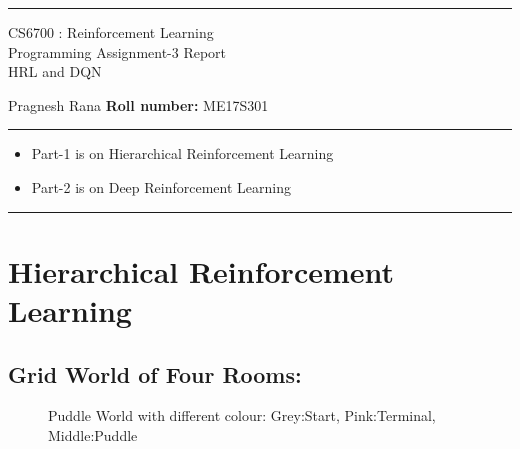\documentclass[preprint,12pt]{elsarticle}
\begin{document}
\hrule
\vspace{1mm}
\noindent 
\begin{center}
{\Large CS6700 : Reinforcement Learning} \\

{\large Programming Assignment-3 Report} \\
{\large HRL and DQN   \hfill }
\end{center}
\vspace{1mm}
\noindent 



 Pragnesh Rana \hfill {\bf Roll number:} ME17S301
\vspace{2mm}
\hrule

{\small

\begin{itemize}\itemsep0mm
\item Part-1 is on Hierarchical Reinforcement Learning
\item Part-2 is on Deep Reinforcement Learning 
\end{itemize}
}
\hrule



\section{Hierarchical Reinforcement Learning}

\subsection{Grid World of Four Rooms:}



\begin{figure}[H]
	\centering  
	\caption{Puddle World with different colour: Grey:Start, Pink:Terminal, Middle:Puddle }
	\label{fig:puddle}
\end{figure}
\end{document}
